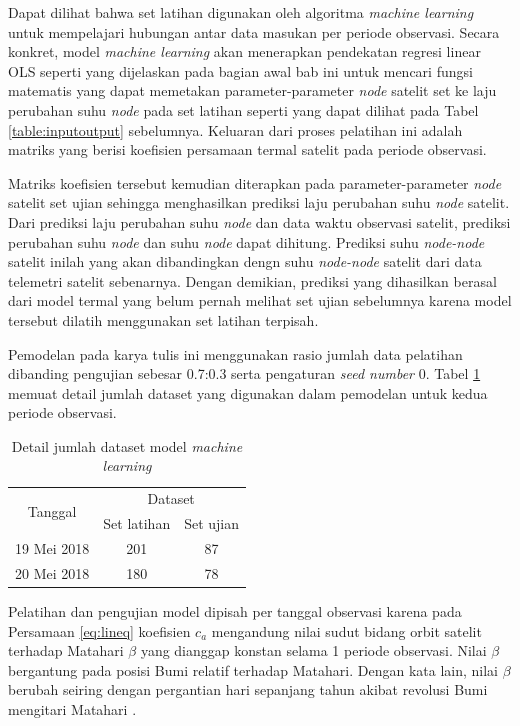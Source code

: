Dapat dilihat bahwa set latihan digunakan oleh algoritma \textit{machine
learning} untuk mempelajari hubungan antar data masukan per periode observasi.
Secara konkret, model \textit{machine learning} akan menerapkan pendekatan
regresi linear OLS seperti yang dijelaskan pada bagian awal bab ini untuk
mencari fungsi matematis yang dapat memetakan parameter-parameter \textit{node}
satelit set ke laju perubahan suhu \textit{node} pada set latihan seperti yang
dapat dilihat pada Tabel \ref{table:inputoutput} sebelumnya. Keluaran dari
proses pelatihan ini adalah matriks yang berisi koefisien persamaan termal
satelit pada periode observasi.

Matriks koefisien tersebut kemudian diterapkan pada parameter-parameter
\textit{node} satelit set ujian sehingga menghasilkan prediksi laju perubahan
suhu \textit{node} satelit. Dari prediksi laju perubahan suhu \textit{node} dan
data waktu observasi satelit, prediksi perubahan suhu \textit{node} dan suhu
\textit{node} dapat dihitung. Prediksi suhu \textit{node-node} satelit inilah
yang akan dibandingkan dengn suhu \textit{node-node} satelit dari data
telemetri satelit sebenarnya. Dengan demikian, prediksi yang dihasilkan berasal
dari model termal yang belum pernah melihat set ujian sebelumnya karena model
tersebut dilatih menggunakan set latihan terpisah. 

Pemodelan pada karya tulis ini menggunakan rasio jumlah data
pelatihan dibanding pengujian sebesar 0.7:0.3 serta pengaturan \textit{seed
number} 0. Tabel \ref{table:dataset} memuat detail jumlah dataset yang
digunakan dalam pemodelan untuk kedua periode observasi.

\begin{table}[!ht]
\begin{center}
\caption{Detail jumlah dataset model \textit{machine learning}}
\label{table:dataset}
\begin{tabular}{|c|cc|}
\hline
\multirow{2}{*}{Tanggal} & \multicolumn{2}{c|}{Dataset}                 \\ \cline{2-3} 
                         & \multicolumn{1}{c|}{Set latihan} & Set ujian \\ \hline
19 Mei 2018              & \multicolumn{1}{c|}{201}         & 87        \\ \hline
20 Mei 2018              & \multicolumn{1}{c|}{180}         & 78        \\ \hline
\end{tabular}
\end{center}
\vspace{-5mm}
\end{table}

Pelatihan dan pengujian model dipisah per tanggal observasi karena pada
Persamaan \ref{eq:lineq} koefisien $c_a$ mengandung nilai sudut bidang orbit
satelit terhadap Matahari $\beta$ yang dianggap konstan selama 1 periode
observasi. Nilai $\beta$ bergantung pada posisi Bumi relatif terhadap Matahari.
Dengan kata lain, nilai $\beta$ berubah seiring dengan pergantian hari
sepanjang tahun akibat revolusi Bumi mengitari Matahari \cite{m2019}.
